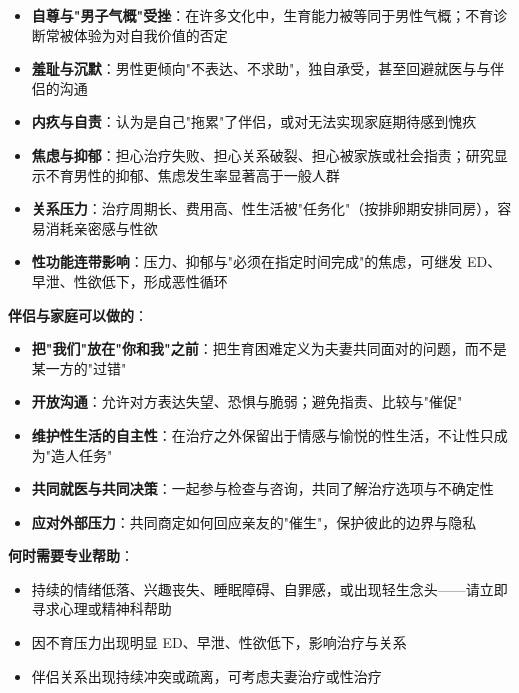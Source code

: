 \begin{itemize}[leftmargin=2cm]
	\item \textbf{自尊与"男子气概"受挫}：在许多文化中，生育能力被等同于男性气概；不育诊断常被体验为对自我价值的否定
	\item \textbf{羞耻与沉默}：男性更倾向"不表达、不求助"，独自承受，甚至回避就医与与伴侣的沟通
	\item \textbf{内疚与自责}：认为是自己"拖累"了伴侣，或对无法实现家庭期待感到愧疚
	\item \textbf{焦虑与抑郁}：担心治疗失败、担心关系破裂、担心被家族或社会指责；研究显示不育男性的抑郁、焦虑发生率显著高于一般人群
	\item \textbf{关系压力}：治疗周期长、费用高、性生活被"任务化"（按排卵期安排同房），容易消耗亲密感与性欲
	\item \textbf{性功能连带影响}：压力、抑郁与"必须在指定时间完成"的焦虑，可继发 ED、早泄、性欲低下，形成恶性循环
\end{itemize}

\vspace{0.5em}
\noindent\textbf{伴侣与家庭可以做的}：

\begin{itemize}[leftmargin=2cm]
	\item \textbf{把"我们"放在"你和我"之前}：把生育困难定义为夫妻共同面对的问题，而不是某一方的"过错"
	\item \textbf{开放沟通}：允许对方表达失望、恐惧与脆弱；避免指责、比较与"催促"
	\item \textbf{维护性生活的自主性}：在治疗之外保留出于情感与愉悦的性生活，不让性只成为"造人任务"
	\item \textbf{共同就医与共同决策}：一起参与检查与咨询，共同了解治疗选项与不确定性
	\item \textbf{应对外部压力}：共同商定如何回应亲友的"催生"，保护彼此的边界与隐私
\end{itemize}

\vspace{0.5em}
\noindent\textbf{何时需要专业帮助}：

\begin{itemize}[leftmargin=2cm]
	\item 持续的情绪低落、兴趣丧失、睡眠障碍、自罪感，或出现轻生念头——请立即寻求心理或精神科帮助
	\item 因不育压力出现明显 ED、早泄、性欲低下，影响治疗与关系
	\item 伴侣关系出现持续冲突或疏离，可考虑夫妻治疗或性治疗
\end{itemize}

